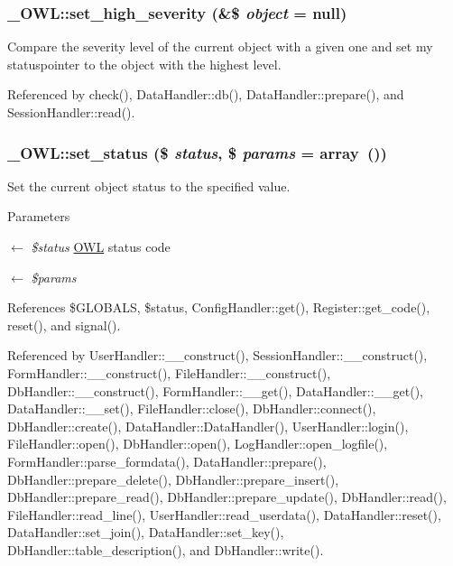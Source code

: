 \subsubsection[{set\_\-high\_\-severity}]{\setlength{\rightskip}{0pt plus 5cm}\_\-OWL::set\_\-high\_\-severity (\&\$ {\em object} = {\ttfamily null})}\label{class__OWL_a576829692a3b66e3d518853bf43abae3}
Compare the severity level of the current object with a given one and set my statuspointer to the object with the highest level. 

Referenced by check(), DataHandler::db(), DataHandler::prepare(), and SessionHandler::read().

\subsubsection[{set\_\-status}]{\setlength{\rightskip}{0pt plus 5cm}\_\-OWL::set\_\-status (\$ {\em status}, \/  \$ {\em params} = {\ttfamily array~()})}\label{class__OWL_aea912d0ede9b3c2a69b79072d94d4787}
Set the current object status to the specified value.


\begin{DoxyParams}{Parameters}
\item[\mbox{$\leftarrow$} {\em \$status}]\hyperlink{classOWL}{OWL} status code \item[\mbox{$\leftarrow$} {\em \$params}]\end{DoxyParams}


References \$GLOBALS, \$status, ConfigHandler::get(), Register::get\_\-code(), reset(), and signal().



Referenced by UserHandler::\_\-\_\-construct(), SessionHandler::\_\-\_\-construct(), FormHandler::\_\-\_\-construct(), FileHandler::\_\-\_\-construct(), DbHandler::\_\-\_\-construct(), FormHandler::\_\-\_\-get(), DataHandler::\_\-\_\-get(), DataHandler::\_\-\_\-set(), FileHandler::close(), DbHandler::connect(), DbHandler::create(), DataHandler::DataHandler(), UserHandler::login(), FileHandler::open(), DbHandler::open(), LogHandler::open\_\-logfile(), FormHandler::parse\_\-formdata(), DataHandler::prepare(), DbHandler::prepare\_\-delete(), DbHandler::prepare\_\-insert(), DbHandler::prepare\_\-read(), DbHandler::prepare\_\-update(), DbHandler::read(), FileHandler::read\_\-line(), UserHandler::read\_\-userdata(), DataHandler::reset(), DataHandler::set\_\-join(), DataHandler::set\_\-key(), DbHandler::table\_\-description(), and DbHandler::write().

